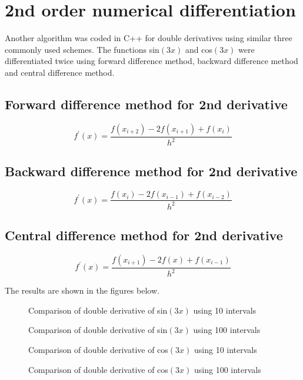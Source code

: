 \documentclass[12pt,a4paper,fleqn]{article}
\begin{document}
		\section*{2nd order numerical differentiation}
		Another algorithm was coded in C++ for double derivatives using similar three commonly used schemes. The functions sin$(3x)$ and cos$(3x)$ were differentiated twice using forward difference method, backward difference method and central difference method.
		
		\subsection*{Forward difference method for 2nd derivative}
		\begin{equation}
		f^\prime(x) = \frac{f(x_{i+2})-2f(x_{i+1})+f(x_i)}{h^2}
		\end{equation}
		
		\subsection*{Backward difference method for 2nd derivative}
		\begin{equation}
		f^\prime(x) = \frac{f(x_i)-2f(x_{i-1})+f(x_{i-2})}{h^2}
		\end{equation}
		
		\subsection*{Central difference method for 2nd derivative}
		\begin{equation}
		f^\prime(x) = \frac{f(x_{i+1})-2f(x)+f(x_{i-1})}{h^2}
		\end{equation}
		
		The results are shown in the figures below.

		\begin{figure}
			\centering
			
			\caption{Comparison of double derivative of sin$(3x)$ using 10 intervals}
		\end{figure}
		\begin{figure}
			\centering
			
			\caption{Comparison of double derivative of sin$(3x)$ using 100 intervals}
		\end{figure}
		\begin{figure}
			\centering
			
			\caption{Comparison of double derivative of cos$(3x)$ using 10 intervals}
		\end{figure}
		\begin{figure}
			\centering
			
			\caption{Comparison of double derivative of cos$(3x)$ using 100 intervals}
		\end{figure}
\end{document}
